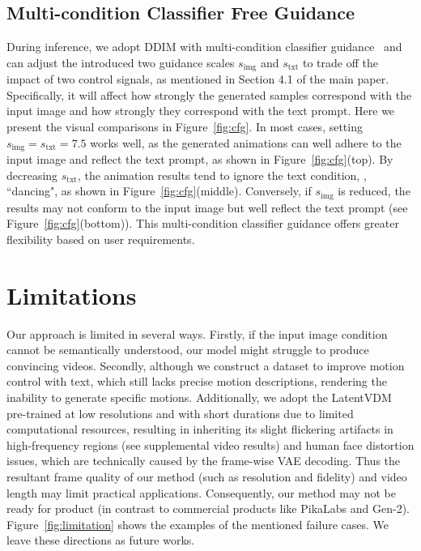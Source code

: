 \subsection{Multi-condition Classifier Free Guidance}
During inference, we adopt DDIM with multi-condition classifier guidance~\cite{ho2022classifier} and can adjust the introduced two guidance scales $s_\text{img}$ and $s_\text{txt}$ to trade off the impact of two control signals, as mentioned in Section 4.1 of the main paper. Specifically, it will affect how strongly the generated samples correspond with the input image and how strongly they correspond with the text prompt. Here we present the visual comparisons in Figure~\ref{fig:cfg}. In most cases, setting $s_\text{img}=s_\text{txt}=7.5$ works well, as the generated animations can well adhere to the input image and reflect the text prompt, as shown in Figure~\ref{fig:cfg}(top). By decreasing $s_\text{txt}$, the animation results tend to ignore the text condition, \eg, ``dancing", as shown in Figure~\ref{fig:cfg}(middle). Conversely, if $s_\text{img}$ is reduced, the results may not conform to the input image but well reflect the text prompt (see Figure~\ref{fig:cfg}(bottom)). This multi-condition classifier guidance offers greater flexibility based on user requirements.

\section{Limitations}
\label{sec:limitation}


Our approach is limited in several ways. Firstly, if the input image condition cannot be semantically understood, our model might struggle to produce convincing videos. Secondly, although we construct a dataset to improve motion control with text, which still lacks precise motion descriptions, rendering the inability to generate specific motions. Additionally, we adopt the LatentVDM pre-trained at low resolutions and with short durations due to limited computational resources, resulting in inheriting its slight flickering artifacts in high-frequency regions (see supplemental video results) and human face distortion issues, which are technically caused by the frame-wise VAE decoding. Thus the resultant frame quality of our method (such as resolution and fidelity) and video length may limit practical applications. Consequently, our method may not be ready for product (in contrast to commercial products like PikaLabs and Gen-2). Figure~\ref{fig:limitation} shows the examples of the mentioned failure cases. We leave these directions as future works.








